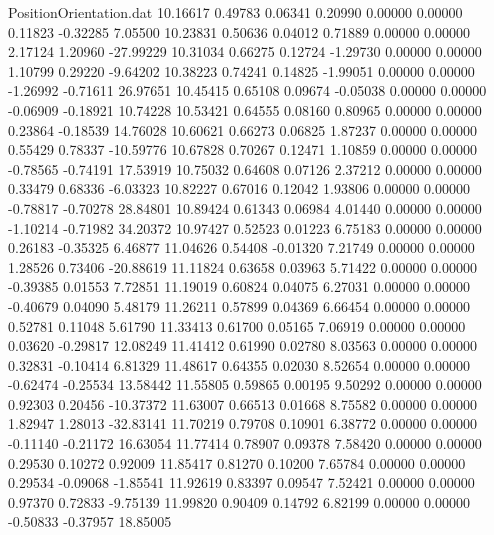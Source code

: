 \begin{filecontents}{PositionOrientation.dat}
  10.16617    0.49783    0.06341     0.20990    0.00000    0.00000    0.11823   -0.32285    7.05500
  10.23831    0.50636    0.04012     0.71889    0.00000    0.00000    2.17124    1.20960  -27.99229
  10.31034    0.66275    0.12724    -1.29730    0.00000    0.00000    1.10799    0.29220   -9.64202
  10.38223    0.74241    0.14825    -1.99051    0.00000    0.00000   -1.26992   -0.71611   26.97651
  10.45415    0.65108    0.09674    -0.05038    0.00000    0.00000   -0.06909   -0.18921   10.74228
  10.53421    0.64555    0.08160     0.80965    0.00000    0.00000    0.23864   -0.18539   14.76028
  10.60621    0.66273    0.06825     1.87237    0.00000    0.00000    0.55429    0.78337  -10.59776
  10.67828    0.70267    0.12471     1.10859    0.00000    0.00000   -0.78565   -0.74191   17.53919
  10.75032    0.64608    0.07126     2.37212    0.00000    0.00000    0.33479    0.68336   -6.03323
  10.82227    0.67016    0.12042     1.93806    0.00000    0.00000   -0.78817   -0.70278   28.84801
  10.89424    0.61343    0.06984     4.01440    0.00000    0.00000   -1.10214   -0.71982   34.20372
  10.97427    0.52523    0.01223     6.75183    0.00000    0.00000    0.26183   -0.35325    6.46877
  11.04626    0.54408   -0.01320     7.21749    0.00000    0.00000    1.28526    0.73406  -20.88619
  11.11824    0.63658    0.03963     5.71422    0.00000    0.00000   -0.39385    0.01553    7.72851
  11.19019    0.60824    0.04075     6.27031    0.00000    0.00000   -0.40679    0.04090    5.48179
  11.26211    0.57899    0.04369     6.66454    0.00000    0.00000    0.52781    0.11048    5.61790
  11.33413    0.61700    0.05165     7.06919    0.00000    0.00000    0.03620   -0.29817   12.08249
  11.41412    0.61990    0.02780     8.03563    0.00000    0.00000    0.32831   -0.10414    6.81329
  11.48617    0.64355    0.02030     8.52654    0.00000    0.00000   -0.62474   -0.25534   13.58442
  11.55805    0.59865    0.00195     9.50292    0.00000    0.00000    0.92303    0.20456  -10.37372
  11.63007    0.66513    0.01668     8.75582    0.00000    0.00000    1.82947    1.28013  -32.83141
  11.70219    0.79708    0.10901     6.38772    0.00000    0.00000   -0.11140   -0.21172   16.63054
  11.77414    0.78907    0.09378     7.58420    0.00000    0.00000    0.29530    0.10272    0.92009
  11.85417    0.81270    0.10200     7.65784    0.00000    0.00000    0.29534   -0.09068   -1.85541
  11.92619    0.83397    0.09547     7.52421    0.00000    0.00000    0.97370    0.72833   -9.75139
  11.99820    0.90409    0.14792     6.82199    0.00000    0.00000   -0.50833   -0.37957   18.85005

\end{filecontents}
